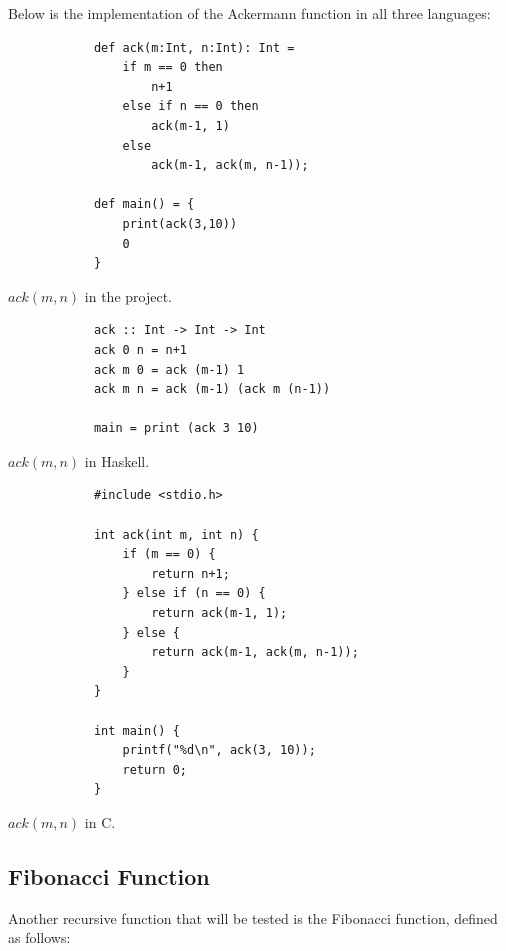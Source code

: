 Below is the implementation of the Ackermann function in all three languages:

\vspace{0.3cm}
\begin{tcbitemize}[raster columns=3, raster equal height=rows,size=small,space to upper]
    \tcbitem
        \footnotesize
        \begin{verbatim}
            def ack(m:Int, n:Int): Int =
                if m == 0 then
                    n+1
                else if n == 0 then
                    ack(m-1, 1)
                else
                    ack(m-1, ack(m, n-1));

            def main() = {
                print(ack(3,10))
                0
            }
        \end{verbatim}
        \tcblower
        \footnotesize $ack(m, n)$ in the project.
    \tcbitem
        \footnotesize
        \begin{verbatim}
            ack :: Int -> Int -> Int
            ack 0 n = n+1
            ack m 0 = ack (m-1) 1
            ack m n = ack (m-1) (ack m (n-1))

            main = print (ack 3 10)
        \end{verbatim}
        \vfill
        \tcblower
        \footnotesize $ack(m, n)$ in Haskell.
    \tcbitem
        \scriptsize
        \begin{verbatim}
            #include <stdio.h>

            int ack(int m, int n) {
                if (m == 0) {
                    return n+1;
                } else if (n == 0) {
                    return ack(m-1, 1);
                } else {
                    return ack(m-1, ack(m, n-1));
                }
            }

            int main() {
                printf("%d\n", ack(3, 10));
                return 0;
            }
        \end{verbatim}
        \tcblower
        \footnotesize $ack(m, n)$ in C.
\end{tcbitemize}
\vspace{0.4cm}

\subsection{Fibonacci Function}

Another recursive function that will be tested is the Fibonacci function, defined as follows:

